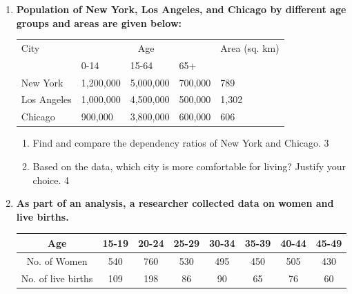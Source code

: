 \documentclass[a4paper,oneside]{book}
\begin{document}
\begin{enumerate}
  \begin{enumerate}
    \item
	Write down the formula of dependency ratio. \hfill 1
    \item
	What is meant by NRR = 0.983? \hfill 2
    \item  
	Find and compare between the dependency ratios of the cities. \hfill 3
    \item
	Based on data, which city is more comfortable for living? \hfill 4
  \end{enumerate}
  
  \item
  \textbf{Population of New York, Los Angeles, and Chicago by different age groups and areas are given below:} 
  
  \begin{table}[h]
  \begin{center}
  \begin{tabular}{lllll}
  City         & \multicolumn{3}{c}{Age}         & Area (sq. km) \\
               & 0-14      & 15-64    & 65+      &               \\
  New York     & 1,200,000 & 5,000,000 & 700,000  & 789           \\
  Los Angeles  & 1,000,000 & 4,500,000 & 500,000  & 1,302         \\
  Chicago      & 900,000   & 3,800,000 & 600,000  & 606           \\
  \end{tabular}
  \end{center}
  \end{table}
  
  \begin{enumerate}
    \item  
    Find and compare the dependency ratios of New York and Chicago. \hfill 3
    \item
    Based on the data, which city is more comfortable for living? Justify your
    choice. \hfill 4
  \end{enumerate}

  
  
   \item
	  \textbf{As part of an analysis, a researcher collected data on women and live births.} 
	  \begin{table}[h]
	  \centering
\begin{tabular}{c|c|c|c|c|c|c|c}
Age & 15-19 & 20-24 & 25-29 & 30-34 & 35-39 & 40-44 & 45-49 \\ \hline
No. of Women & 540 & 760 & 530 & 495 & 450 & 505 & 430 \\ \hline
No. of live births & 109 & 198 & 86 & 90 & 65 & 76 & 60
\end{tabular}
\end{table}
  

\end{enumerate}
\end{document}
